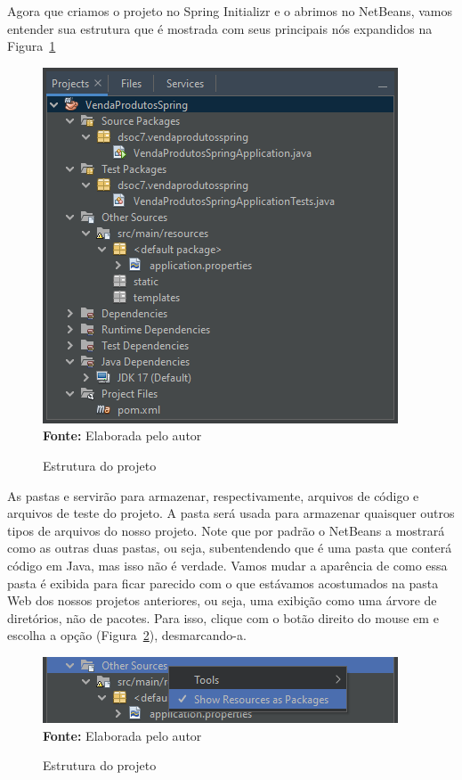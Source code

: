 Agora que criamos o projeto no Spring Initializr e o abrimos no NetBeans, vamos entender sua estrutura que é mostrada com seus principais nós expandidos na Figura~\ref{fig:cap10EstruturaProjeto}

\FloatBarrier
\begin{figure}[!htbp]
    \centering
    \caption{Estrutura do projeto}
    \includegraphics[scale=1]{imagens/cap10EstruturaProjeto}
    \\\textbf{Fonte:} Elaborada pelo autor
    \label{fig:cap10EstruturaProjeto}
\end{figure}
\FloatBarrier

As pastas  e  servirão para armazenar, respectivamente, arquivos de código e arquivos de teste do projeto. A pasta  será usada para armazenar quaisquer outros tipos de arquivos do nosso projeto. Note que por padrão o NetBeans a mostrará como as outras duas pastas, ou seja, subentendendo que é uma pasta que conterá código em Java, mas isso não é verdade. Vamos mudar a aparência de como essa pasta é exibida para ficar parecido com o que estávamos acostumados na pasta Web dos nossos projetos anteriores, ou seja, uma exibição como uma árvore de diretórios, não de pacotes. Para isso, clique com o botão direito do mouse em  e escolha a opção  (Figura~\ref{fig:cap10ShowResourcesAsPackages}), desmarcando-a. 

\FloatBarrier
\begin{figure}[!htbp]
    \centering
    \caption{Estrutura do projeto}
    \includegraphics[scale=1]{imagens/cap10ShowResourcesAsPackages}
    \\\textbf{Fonte:} Elaborada pelo autor
    \label{fig:cap10ShowResourcesAsPackages}
\end{figure}
\FloatBarrier

